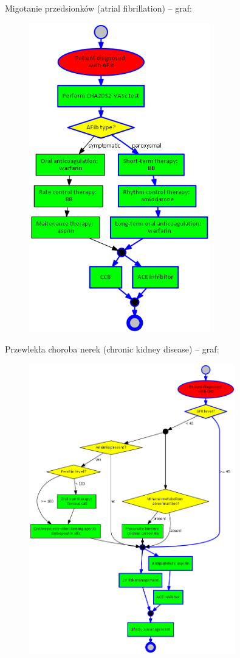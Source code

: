 \documentclass[oneside,a4paper]{book}
\begin{document}
\begin{spacing}{1.5}
Migotanie przedsionków  (atrial fibrillation) – graf:
\begin{figure}[H]
\centering
\includegraphics[width=0.7\textwidth]{img/afib-ver-4.png}
\end{figure}
\newpage
Przewlekła choroba nerek (chronic kidney disease) – graf:
\begin{figure}[H]
\centering
\includegraphics[width=0.8\textwidth]{img/ckd-simplified-ver-5.png}

\end{figure}
\end{spacing}
\end{document}
